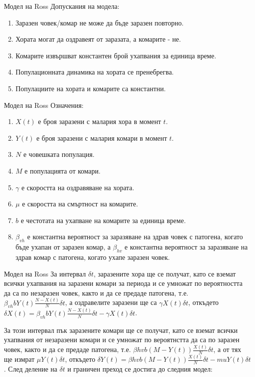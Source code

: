 \begin{frame}[t]{Модел на Ross}
  Допускания на модела:
  \begin{enumerate}
    \item Заразен човек/комар не може да бъде заразен повторно.
    \item Хората могат да оздравеят от заразата, а комарите - не.
    \item Комарите извършват константен брой ухапвания за единица време.
    \item Популационната динамика на хората се пренебрегва.
    \item Популациите на хората и комарите са константни.
  \end{enumerate}
\end{frame}

\begin{frame}[t]{Модел на Ross}
  Означения:
  \begin{enumerate}
    \item $X(t)$ е броя заразени с малария хора в момент $t$.
    \item $Y(t)$ е броя заразени с малария комари в момент $t$.
    \item $N$ е човешката популация.
    \item $M$ е популацията от комари.
    \item $\gamma$ е скоростта на оздравяване на хората.
    \item $\mu$ е скоростта на смъртност на комарите.
    \item $b$ е честотата на ухапване на комарите за единица време.
    \item $\beta_{vh}$ е константна вероятност за заразяване на здрав човек с патогена, когато бъде ухапан от заразен комар, а $\beta_{hv}$ е константна вероятност за заразяване на здрав комар с патогена, когато ухапе заразен човек.
  \end{enumerate}
\end{frame}

\begin{frame}[t]{Модел на Ross}
  За интервал $\delta t$, заразените хора ще се получат, като се вземат всички ухапвания на заразени комари за периода и се умножат по вероятността да са по незаразен човек, както и да се предаде патогена, т.е. $\beta_{vh} b Y(t) \frac{N-X(t)}{N} \delta t$, а оздравелите заразени ще са $\gamma X(t) \delta t$, откъдето $\delta X(t) = \beta_{vh} b Y(t) \frac{N-X(t)}{N} \delta t - \gamma X(t) \delta t$.

  За този интервал пък заразените комари ще се получат, като се вземат всички ухапвания от незаразени комари и се умножат по вероятнстта да са по заразен човек, както и да се предаде патогена, т.е. $\beta{hv} b (M - Y(t)) \frac{X(t)}{N} \delta t$, а от тях ще измрат $\mu Y(t) \delta t$, откъдето $\delta Y(t) = \beta{hv} b (M - Y(t)) \frac{X(t)}{N} \delta t - mu Y(t) \delta t$. След деление на $\delta t$ и граничен преход се достига до следния модел:
\end{frame}

